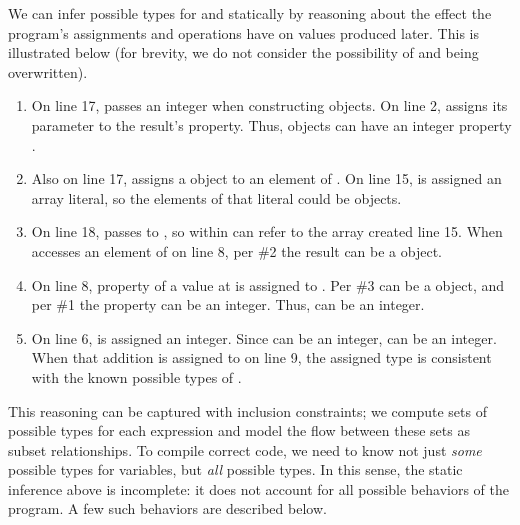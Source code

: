We can infer possible types for  and  statically
by reasoning about the effect the program's assignments
and operations have on values produced later.
This is illustrated below (for brevity, we do not consider
the possibility of  and  being overwritten).

\begin{enumerate}
\item On line 17,  passes an integer when constructing 
      objects. On line 2,  assigns its parameter to the result's
       property. Thus,  objects can have an
      integer property .
\item Also on line 17,  assigns a  object to an element
      of . On line 15,  is assigned an array literal,
      so the elements of that literal could be  objects.
\item On line 18,  passes  to , so 
      within  can refer to the array created line 15.
      When  accesses an element of  on line 8,
      per \#2 the result can be a  object.
\item On line 8, property  of a value at  is assigned to .
      Per \#3  can be a  object, and per \#1 the
       property can be an integer. Thus,  can be an integer.
\item On line 6,  is assigned an integer. Since  can be
      an integer,  can be an integer.
      When that addition is assigned to  on line 9, the assigned
      type is consistent with the known possible types of .
\end{enumerate}

This reasoning can be captured with inclusion constraints; we compute
sets of possible types for each expression and model the flow between
these sets as subset relationships.
To compile correct code, we need to know not just \emph{some}
possible types for variables, but \emph{all} possible types.
In this sense, the static inference above is incomplete: it does not account
for all possible behaviors of the program.
A few such behaviors are described below.


